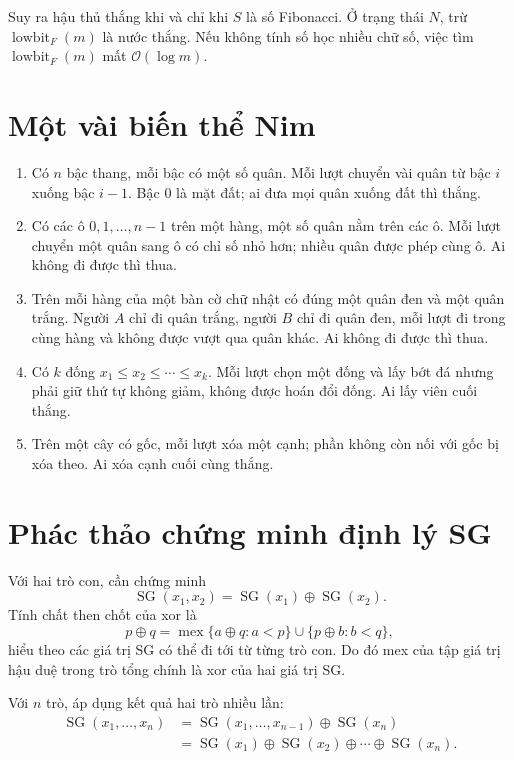 \documentclass[11pt]{article}
\newcommand{\Oh}{\mathcal{O}}
\newcommand{\SG}{\operatorname{SG}}
\newcommand{\mex}{\operatorname{mex}}
\newcommand{\xor}{\oplus}
\newcommand{\lowbitF}{\operatorname{lowbit}_{F}}
\begin{document}
Suy ra hậu thủ thắng khi và chỉ khi \(S\) là số Fibonacci. Ở trạng thái \(N\),
trừ \(\lowbitF(m)\) là nước thắng. Nếu không tính số học nhiều chữ số, việc
tìm \(\lowbitF(m)\) mất \(\Oh(\log m)\).

\section{Một vài biến thể Nim}

\begin{enumerate}
  \item Có \(n\) bậc thang, mỗi bậc có một số quân. Mỗi lượt chuyển vài quân
  từ bậc \(i\) xuống bậc \(i-1\). Bậc \(0\) là mặt đất; ai đưa mọi quân xuống
  đất thì thắng.
  \item Có các ô \(0,1,\ldots,n-1\) trên một hàng, một số quân nằm trên các ô.
  Mỗi lượt chuyển một quân sang ô có chỉ số nhỏ hơn; nhiều quân được phép cùng
  ô. Ai không đi được thì thua.
  \item Trên mỗi hàng của một bàn cờ chữ nhật có đúng một quân đen và một
  quân trắng. Người \(A\) chỉ đi quân trắng, người \(B\) chỉ đi quân đen, mỗi
  lượt đi trong cùng hàng và không được vượt qua quân khác. Ai không đi được
  thì thua.
  \item Có \(k\) đống \(x_1\le x_2\le\cdots\le x_k\). Mỗi lượt chọn một đống
  và lấy bớt đá nhưng phải giữ thứ tự không giảm, không được hoán đổi đống.
  Ai lấy viên cuối thắng.
  \item Trên một cây có gốc, mỗi lượt xóa một cạnh; phần không còn nối với gốc
  bị xóa theo. Ai xóa cạnh cuối cùng thắng.
\end{enumerate}

\section{Phác thảo chứng minh định lý SG}

Với hai trò con, cần chứng minh
\[
  \SG(x_1,x_2)=\SG(x_1)\xor\SG(x_2).
\]
Tính chất then chốt của xor là
\[
  p\xor q=\mex\{a\xor q:a<p\}\cup\{p\xor b:b<q\},
\]
hiểu theo các giá trị SG có thể đi tới từ từng trò con. Do đó mex của tập giá
trị hậu duệ trong trò tổng chính là xor của hai giá trị SG.

Với \(n\) trò, áp dụng kết quả hai trò nhiều lần:
\[
\begin{aligned}
\SG(x_1,\ldots,x_n)
&=\SG(x_1,\ldots,x_{n-1})\xor\SG(x_n)\\
&=\SG(x_1)\xor\SG(x_2)\xor\cdots\xor\SG(x_n).
\end{aligned}
\]
\end{document}
